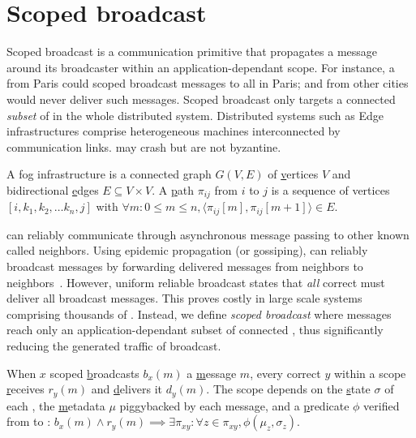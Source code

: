 

\vfill {}
\newpage

\section{Scoped broadcast}
\label{sec:scoped}

Scoped broadcast is a communication primitive that propagates a
message around its broadcaster within an application-dependant scope.
For instance, a \process from Paris could scoped broadcast messages to
all \processes in Paris; and \processes from other cities would never
deliver such messages.
Scoped broadcast only targets a connected \emph{subset} of \processes
in the whole distributed system.
%
Distributed systems such as Edge infrastructures comprise
heterogeneous machines interconnected by communication
links. \Processes may crash but are not byzantine.


\begin{definition}
  A fog infrastructure is a connected \underline{g}raph $G(V, E)$ of
  \underline{v}ertices $V$ and bidirectional \underline{e}dges $E
  \subseteq V \times V$.  A \underline{p}ath $\pi_{ij}$ from \Process
  $i$ to \Process $j$ is a sequence of vertices $[i, k_1, k_2, \ldots
    k_n, j]$ with $\forall m: 0\leq m \leq n, \langle \pi_{ij}[m],
  \pi_{ij}[m+1] \rangle \in E$.
\end{definition}

\Processes can reliably communicate through asynchronous message
passing to other known \processes called neighbors. Using epidemic
propagation (or gossiping), \processes can reliably broadcast messages
by forwarding delivered messages from neighbors to
neighbors~\cite{birman1999bimodal, hadzilacos1994modular,
  nedelec2018causal, raynal2013distributed}. However, uniform reliable
broadcast states that \emph{all} correct \processes must deliver all
broadcast messages. This proves costly in large scale systems
comprising thousands of \processes. Instead, we define \emph{scoped
broadcast} where messages reach only an application-dependant subset
of connected \processes, thus significantly reducing the generated
traffic of broadcast.

\begin{definition}
  When \Process $x$ scoped \underline{b}roadcasts $b_x(m)$ a
  \underline{m}essage $m$, every correct \process $y$ within a scope
  \underline{r}eceives $r_y(m)$ and \underline{d}elivers it
  $d_y(m)$. The scope depends on the \underline{s}tate $\sigma$ of
  each \process, the \underline{m}etadata $\mu$ piggybacked by each
  message, and a \underline{p}redicate $\phi$ verified from \process to
  \process: {\small{$b_x(m) \wedge r_y(m) \implies \exists \pi_{xy}: \forall z
  \in \pi_{xy}, \phi(\mu_z, \sigma_z)$}}.
\end{definition}


